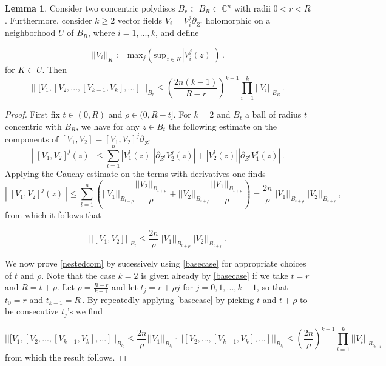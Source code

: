 \documentclass{article}
\theoremstyle{definition}
\newtheorem{lemma}[theorem]{Lemma}
\numberwithin{equation}{section}
\begin{document}
\begin{lemma}\label{prelem} Consider two concentric polydiscs $B_r\subset B_R\subset \mathbb{C}^n$ with radii $0<r<R$. Furthermore, consider $k\geq 2$ vector fields $V_i=V_i^j\partial_{Z^j}$ holomorphic on a neighborhood $U$ of $B_R$, where $i=1,...,k$, and define

\begin{equation}\label{vectnorm}
    ||V_i||_{K}:=\text{max}_j(\text{sup}_{z\in K}|V_i^j(z)|)\,.
\end{equation}
for $K\subset U.$ Then 
\begin{equation}\label{nestedcom}
    ||\;[V_1,[V_2,...,[V_{k-1},V_k],...]\;||_{B_r}\leq \left(\frac{2n(k-1)}{R-r}\right)^{k-1}\prod_{i=1}^k||V_i||_{B_R}\,.
\end{equation}
\end{lemma}
\begin{proof}
    First fix $t\in (0,R)$ and $\rho\in (0,R-t]$. For $k=2$ and $B_t$ a ball of radius $t$ concentric with $B_R$, we have for any $z\in B_t$ the following estimate on the components of $[V_1,V_2]=[V_1,V_2]^j\partial_{Z^j}$
    \begin{equation*}
        | \; [V_1,V_2]^j(z) \; |\leq \sum_{l=1}^{n}|V_1^l(z)||\partial_{Z^l}V_2^j(z)|+|V_2^l(z)||\partial_{Z^l}V_1^j(z)|\,.
    \end{equation*}
    Applying the Cauchy estimate on the terms with derivatives one finds
    \begin{equation*}
        | \; [V_1,V_2]^j(z) \; |\leq \sum_{l=1}^{n}\left(||V_1||_{B_{t+\rho}}\frac{||V_2||_{B_{t+\rho}}}{\rho}+||V_2||_{B_{t+\rho}}\frac{||V_1||_{B_{t+\rho}}}{\rho}\right)=\frac{2n}{\rho}||V_1||_{B_{t+\rho}}||V_2||_{B_{t+\rho}}\,,
    \end{equation*}
    from which it follows that 

    \begin{equation}\label{basecase}
        ||[V_1,V_2]||_{B_t}\leq \frac{2n}{\rho}||V_1||_{B_{t+\rho}}||V_2||_{B_{t+\rho}}\,.
    \end{equation}

    We now prove \eqref{nestedcom} by sucessively using \eqref{basecase} for appropriate choices of $t$ and $\rho$. Note that the case $k=2$ is given already by \eqref{basecase} if we take $t=r$ and $R=t+\rho$. Let $\rho=\frac{R-r}{k-1}$ and let $t_j=r+\rho j$ for $j=0,1,...,k-1$, so that $t_0=r$ and $t_{k-1}=R\,$. By repeatedly applying \eqref{basecase} by picking $t$ and $t+\rho$ to be consecutive $t_j$'s we find 

    \begin{equation*}
        ||[V_1,[V_2,...,[V_{k-1},V_k],...]||_{B_{t_0}}\leq \frac{2n}{\rho}||V_{1}||_{B_{t_1}}\cdot ||[V_2,...,[V_{k-1},V_k],...]||_{B_{t_1}}\leq \left(\frac{2n}{\rho}\right)^{k-1}\prod_{i=1}^{k}||V_{i}||_{B_{t_{k-1}}}
    \end{equation*}
    from which the result follows.
\end{proof}
\end{document}
